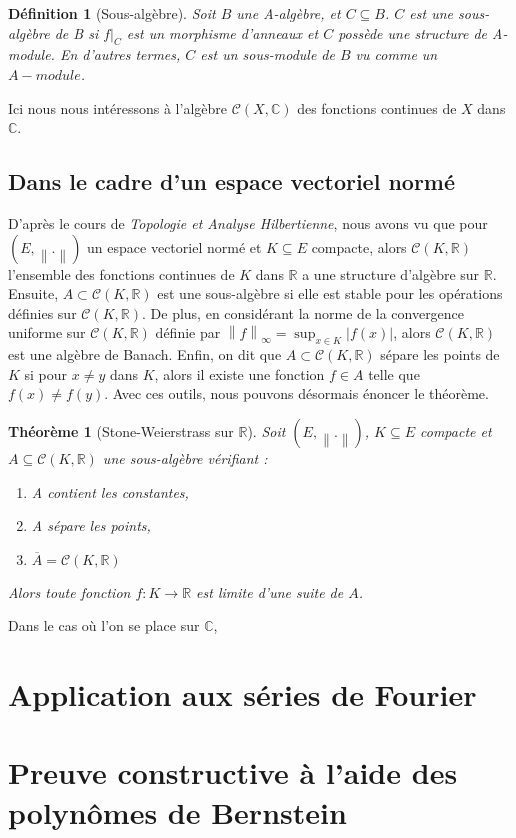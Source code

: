 \documentclass{amsart}
\newtheorem{definition}[subsubsection]{Définition}
\newtheorem{theorem}[subsubsection]{Théorème}
\begin{document}
\begin{definition}[Sous-algèbre]
	Soit \( B \) une \textit{A-algèbre}, et \( C \subseteq B \). 
	\( C \) est une \textit{sous-algèbre de B} si 
	\( {f|}_C \) est un morphisme d'anneaux 
	et \( C \) possède une structure de \textit{A-module}. 
	En d'autres termes, \( C \) est un \textit{sous-module} de \( B \) 
	vu comme un \( A-module \).
\end{definition}

Ici nous nous intéressons à l'algèbre \( \mathcal{C} (X,\mathbb{C}) \) des fonctions continues de \( X \) dans \( \mathbb{C} \).


\subsection{Dans le cadre d'un espace vectoriel normé}

D'après le cours de \textit{Topologie et Analyse Hilbertienne}, nous avons vu que pour 
\((E, {\left\lVert . \right\rVert})\) un espace vectoriel normé et \( K \subseteq E \) compacte, alors 
\( \mathcal{C}(K,\mathbb{R}) \) l'ensemble des fonctions continues de \( K \) dans \( \mathbb{R} \) a une structure d'algèbre sur \( \mathbb{R} \). 
Ensuite, \( A \subset \mathcal{C}(K,\mathbb{R}) \) est une sous-algèbre si elle est stable 
pour les opérations définies sur \( \mathcal{C}(K,\mathbb{R}) \).
De plus, en considérant la norme de la convergence uniforme sur \( \mathcal{C}(K,\mathbb{R}) \) 
définie par \( {\left\lVert f \right\rVert_{\infty}} = \sup_{x \in K}{\left\lvert f(x) \right\rvert} \),
alors \(\mathcal{C}(K,\mathbb{R}) \) est une algèbre de Banach.
Enfin, on dit que \( A \subset \mathcal{C}(K,\mathbb{R}) \) sépare les points de \( K \) si pour \( x \neq y \) dans \( K \), alors il existe une fonction \( f \in A \) telle que 
\( f(x) \neq f(y) \). Avec ces outils, nous pouvons désormais énoncer le théorème.

\begin{theorem}[Stone-Weierstrass sur \( \mathbb{R} \)]
	Soit \( (E,{\left\lVert . \right\rVert}) \), \( K \subseteq E \) compacte et 
	\( A \subseteq \mathcal{C}(K,\mathbb{R}) \) une sous-algèbre vérifiant :
	\begin{enumerate}[label = (\roman*)]
		\item A contient les constantes,
		\item A sépare les points,
		\item \( \overline{A} = \mathcal{C}(K,\mathbb{R}) \)
	\end{enumerate}
	Alors toute fonction \( f : K \rightarrow \mathbb{R} \) est limite d'une suite de \( A \).
\end{theorem}

\par Dans le cas où l'on se place sur \( \mathbb{C} \),  





\section{Application aux séries de Fourier}


\section{Preuve constructive à l'aide des polynômes de Bernstein}

\clearpage
\printbibliography
\end{document}
